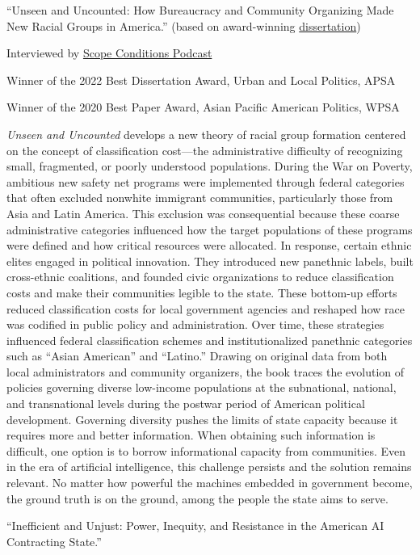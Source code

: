 \documentclass[10pt, letterpaper]{article}
\renewenvironment{itemize}{
\begin{list}{}{
        \setlength{\leftmargin}{1.5em}
        \setlength{\itemsep}{0.10em}
        \setlength{\parskip}{0pt}
        \setlength{\parsep}{0.10em}
    }
}{
\end{list}
}
\begin{document}
\begin{enumerate}
    \item ``Unseen and Uncounted: How Bureaucracy and Community Organizing Made New Racial Groups in America.'' (based on award-winning \href{https://escholarship.org/content/qt3531f8fr/qt3531f8fr.pdf}{dissertation})

\begin{itemize}
    \item Interviewed by \href{https://www.scopeconditionspodcast.com/episodes/episode-34-comparing-asian-coalitions-across-three-chinatowns-with-jae-yeon-kim?fbclid=IwAR1_zGE57lmVDhg8uQA8FfDbdzOybB704Q2m0VQkkhfWtB7Asj29I_-mxPM}{Scope Conditions Podcast} 
    \item Winner of the 2022 Best Dissertation Award, Urban and Local Politics, APSA
    \item Winner of the 2020 Best Paper Award, Asian Pacific American Politics, WPSA
\end{itemize}

\smallskip
\emph{Unseen and Uncounted} develops a new theory of racial group formation centered on the concept of classification cost---the administrative difficulty of recognizing small, fragmented, or poorly understood populations. During the War on Poverty, ambitious new safety net programs were implemented through federal categories that often excluded nonwhite immigrant communities, particularly those from Asia and Latin America. This exclusion was consequential because these coarse administrative categories influenced how the target populations of these programs were defined and how critical resources were allocated. In response, certain ethnic elites engaged in political innovation. They introduced new panethnic labels, built cross-ethnic coalitions, and founded civic organizations to reduce classification costs and make their communities legible to the state. These bottom-up efforts reduced classification costs for local government agencies and reshaped how race was codified in public policy and administration. Over time, these strategies influenced federal classification schemes and institutionalized panethnic categories such as ``Asian American'' and ``Latino.'' Drawing on original data from both local administrators and community organizers, the book traces the evolution of policies governing diverse low-income populations at the subnational, national, and transnational levels during the postwar period of American political development. Governing diversity pushes the limits of state capacity because it requires more and better information. When obtaining such information is difficult, one option is to borrow informational capacity from communities. Even in the era of artificial intelligence, this challenge persists and the solution remains relevant. No matter how powerful the machines embedded in government become, the ground truth is on the ground, among the people the state aims to serve.

\vspace{0.6em}
\item ``Inefficient and Unjust: Power, Inequity, and Resistance in the American AI Contracting State.''

\end{enumerate}
\end{document}

